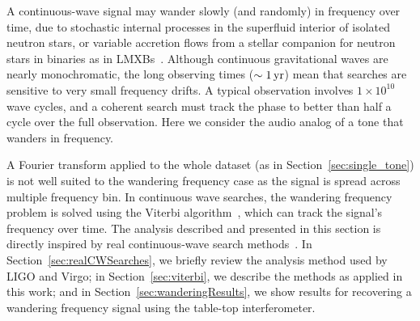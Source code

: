 \documentclass[paper-main.tex]{subfiles}
\begin{document}
A continuous-wave signal may wander slowly (and randomly) in frequency over time, due to stochastic internal processes in the superfluid interior of isolated neutron stars\cite{MelatosDouglassSimula:2015,Jones:2010}, or variable accretion flows from a stellar companion for neutron stars in binaries as in LMXBs~\cite{BildstenTB:1998}.
Although continuous gravitational waves are nearly monochromatic, the long observing times ($\sim 1\,{\rm yr}$) mean that searches are sensitive to very small frequency drifts. 
A typical observation involves $1 \times 10^{10}$ wave cycles, and a coherent search must track the phase to better than half a cycle over the full observation. 
Here we consider the audio analog of a tone that wanders in frequency. 




A Fourier transform applied to the whole dataset (as in Section~\ref{sec:single_tone}) is not well suited to the wandering frequency case as the signal is spread across multiple frequency bin. 
In continuous wave searches, the wandering frequency problem is solved using the Viterbi algorithm~\cite{Viterbi:1967}, which can track the signal's frequency over time.
The analysis described and presented in this section is directly inspired by real continuous-wave search methods~\cite{SuvorovaEtAl:2017}. 
In Section~\ref{sec:realCWSearches}, we briefly review the analysis method used by LIGO and Virgo; in Section~\ref{sec:viterbi}, we describe the methods as applied in this work; and in Section~\ref{sec:wanderingResults}, we show results for recovering a wandering frequency signal using the table-top interferometer. 
\end{document}
